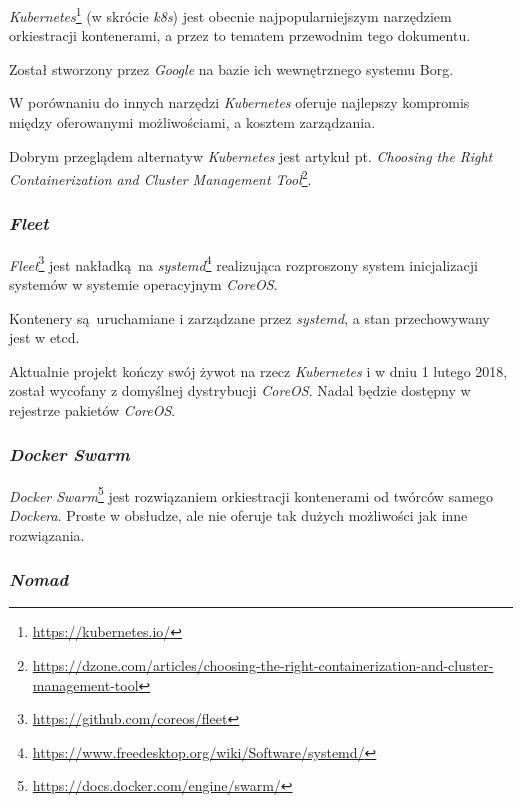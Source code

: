 \documentclass[a4paper,12pt,twoside,openany]{report}
\DeclareRobustCommand{\href}[2]{#2\footnote{\url{#1}}}
\begin{document}
\href{https://kubernetes.io/}{\emph{Kubernetes}} (w skrócie \emph{k8s})
jest obecnie najpopularniejszym narzędziem orkiestracji kontenerami, a
przez to tematem przewodnim tego dokumentu.

Został stworzony przez \emph{Google} na bazie ich wewnętrznego systemu
Borg.

W porównaniu do innych narzędzi \emph{Kubernetes} oferuje najlepszy
kompromis między oferowanymi możliwościami, a kosztem zarządzania.

Dobrym przeglądem alternatyw \emph{Kubernetes} jest artykuł pt.
\href{https://dzone.com/articles/choosing-the-right-containerization-and-cluster-management-tool}{\emph{Choosing
the Right Containerization and Cluster Management Tool}}.

\hypertarget{fleet}{%
\subsubsection{\texorpdfstring{\emph{Fleet}}{Fleet}}\label{fleet}}

\href{https://github.com/coreos/fleet}{\emph{Fleet}} jest nakładką~na
\href{https://www.freedesktop.org/wiki/Software/systemd/}{\emph{systemd}}
realizująca rozproszony system inicjalizacji systemów w systemie
operacyjnym \emph{CoreOS}.

Kontenery są~uruchamiane i zarządzane przez \emph{systemd}, a stan
przechowywany jest w etcd.

Aktualnie projekt kończy swój żywot na rzecz \emph{Kubernetes} i w dniu
1 lutego 2018, został wycofany z domyślnej dystrybucji \emph{CoreOS}.
Nadal będzie dostępny w rejestrze pakietów \emph{CoreOS}.

\hypertarget{docker-swarm}{%
\subsubsection{\texorpdfstring{\emph{Docker
Swarm}}{Docker Swarm}}\label{docker-swarm}}

\href{https://docs.docker.com/engine/swarm/}{\emph{Docker Swarm}} jest
rozwiązaniem orkiestracji kontenerami od twórców samego \emph{Dockera}.
Proste w obsłudze, ale nie oferuje tak dużych możliwości jak inne
rozwiązania.

\hypertarget{nomad}{%
\subsubsection{\texorpdfstring{\emph{Nomad}}{Nomad}}\label{nomad}}
\end{document}
